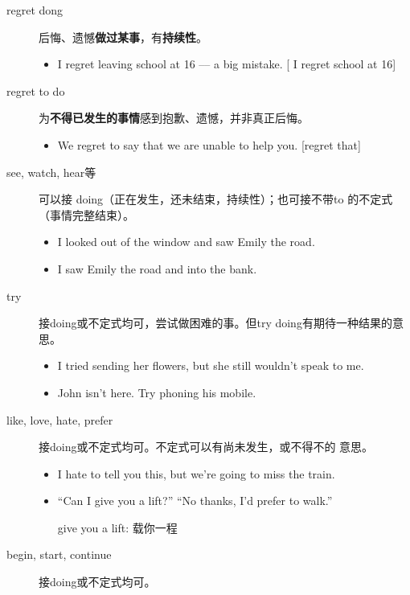 \begin{description}
\item[regret dong] 后悔、遗憾\textbf{做过某事}，有\textbf{持续性}。

  \begin{itemize}
  \item I regret leaving school at 16 –-- a big mistake. [ I regret  school at 16]
  \end{itemize}

\item[regret to do] 为\textbf{不得已发生的事情}感到抱歉、遗憾，并非真正后悔。

  \begin{itemize}
  \item We regret to say that we are unable to help you. [regret  that]
  \end{itemize}

\item[see, watch, hear等] 可以接 doing（正在发生，还未结束，持续性）；也可接不带to
  的不定式（事情完整结束）。
  \begin{itemize}
  \item I looked out of the window and saw Emily  the road.
  \item I saw Emily  the road and  into the bank.
  \end{itemize}


\item[try] 接doing或不定式均可，尝试做困难的事。但try doing有期待一种结果的意思。
  \begin{itemize}
  \item I tried sending her flowers, but she still wouldn't speak to me.
  \item John isn't here. Try phoning his mobile.
  \end{itemize}
\item[like, love, hate, prefer] 接doing或不定式均可。不定式可以有尚未发生，或不得不的
  意思。
  \begin{itemize}
  \item I hate to tell you this, but we're going to miss the train.

  \item ``Can I give you a lift?'' ``No thanks, I'd prefer to walk.''

    give you a lift: 载你一程
  \end{itemize}

\item[begin, start, continue] 接doing或不定式均可。


\end{description}
